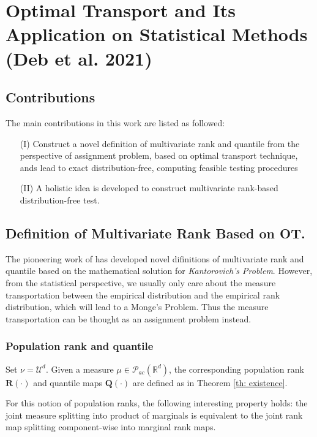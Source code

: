 \chapter{Optimal Transport and Its Application on Statistical Methods (Deb et al. 2021)}

\section{Contributions}
The main contributions in this work are listed as followed:
\begin{enumerate}
	\item[(I)] Construct a novel definition of multivariate rank and quantile from the perspective of assignment problem, based on optimal transport technique, ands lead to exact distribution-free, computing feasible testing procedures
	\item[(II)] A holistic idea is developed to construct multivariate rank-based distribution-free test.
\end{enumerate}

\section{Definition of Multivariate Rank Based on OT.}

The pioneering work of \cite{chernozhukov2017monge} has developed novel difinitions of multivariate rank and quantile based on the mathematical solution for \textit{Kantorovich's Problem}. However, from the statistical perspective, we usually only care about the measure transportation between the empirical distribution and the empirical rank distribution, which will lead to a Monge's Problem. Thus the measure transportation can be thought as an assignment problem instead. 

\subsection{Population rank and quantile}

\begin{definition}
	Set $\nu = \mathcal{U}^d.$ Given a measure $\mu \in \mathcal{P}_{ac}(\mathbb{R}^d)$, the corresponding population rank $\mathbf{R}(\cdot)$ and quantile maps $\mathbf{Q}(\cdot)$ are defined as in Theorem \ref{th: existence}.
\end{definition}
\begin{remark}
	For this notion of population ranks, the following interesting property holds: the joint measure splitting into product of marginals is equivalent to the joint rank map splitting component-wise into marginal rank maps. 
\end{remark}

